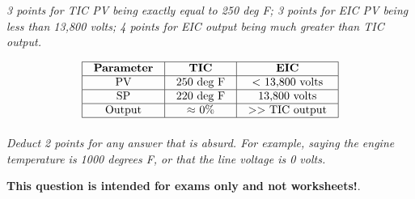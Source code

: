 





{\it 3 points for TIC PV being exactly equal to 250 deg F; 3 points for EIC PV being less than 13,800 volts; 4 points for EIC output being much greater than TIC output.}


$$\vbox{\offinterlineskip
\halign{\strut
\vrule \quad\hfil # \ \hfil & 
\vrule \quad\hfil # \ \hfil & 
\vrule \quad\hfil # \ \hfil \vrule \cr
\noalign{\hrule}
%
{\bf Parameter} & {\bf TIC} & {\bf EIC} \cr
%
\noalign{\hrule}
%
PV & 250 deg F & $<$ 13,800 volts  \cr
%
\noalign{\hrule}
%
SP & 220 deg F & 13,800 volts \cr
%
\noalign{\hrule}
%
Output & $\approx$ 0\% & $>>$ TIC output \cr
%
\noalign{\hrule}
} %
}$$ %

{\it Deduct 2 points for any answer that is absurd.  For example, saying the engine temperature is 1000 degrees F, or that the line voltage is 0 volts.}







{\bf This question is intended for exams only and not worksheets!}.




